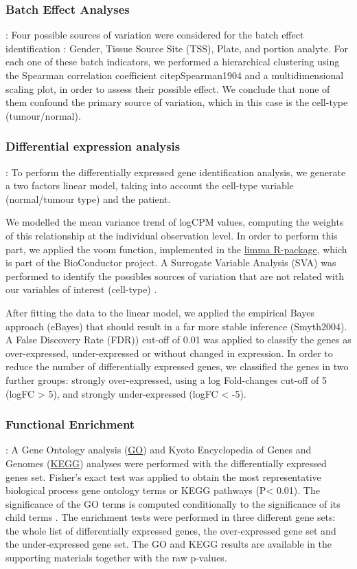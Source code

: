 \documentclass[9pt,twocolumn,twoside]{gsajnl}
\begin{document}
\subsubsection*{Batch Effect Analyses}
: Four possible sources of variation were considered for the batch effect identification \citep{Leek2010}: Gender, Tissue Source Site (TSS), Plate, and portion analyte. For each one of these batch indicators, we performed a hierarchical clustering using the Spearman correlation coefficient citep{Spearman1904}  and a multidimensional scaling plot, in order to assess their possible effect. We conclude that none of them confound the primary source of variation, which in this case is the cell-type (tumour/normal).

\subsubsection*{Differential expression analysis	}
: To perform the differentially expressed gene identification analysis, we generate a two factors linear model, taking into account the cell-type variable (normal/tumour type) and the patient.

We modelled the mean variance trend of logCPM values, computing the weights of this relationship at the individual observation level. In order to perform this part, we applied the voom function, implemented in the \href{https://bioconductor.org/packages/release/bioc/html/limma.html}{limma R-package}, which is part of the BioConductor project. A Surrogate Variable Analysis (SVA) was performed to identify the possibles sources of variation that are not related with our variables of interest (cell-type)  \citep{Leek2007}.

After fitting the data to the linear model, we applied the 	empirical Bayes approach (eBayes) that should result in a far more stable inference (Smyth2004). A False Discovery Rate (FDR)) \citep{Benjamini1995} cut-off of 0.01 was applied to classify the genes as over-expressed, under-expressed or without changed in expression. In order to reduce the number of differentially expressed genes, we classified the genes in two further groups: strongly over-expressed, using a log Fold-changes cut-off of 5 (logFC > 5), and strongly under-expressed (logFC < -5). 

\subsubsection*{Functional Enrichment}
: A Gene Ontology analysis (\href{http://geneontology.org}{GO}) and Kyoto Encyclopedia of Genes and Genomes (\href{http://www.genome.jp/kegg/}{KEGG}) analyses were performed with the differentially expressed genes set. Fisher's exact test \citep{Fisher1922} was applied to obtain the most representative biological process gene ontology terms or KEGG pathways (P< 0.01). The significance of the GO terms is computed conditionally to the significance of its child terms \citep{Alexa2006}. The enrichment tests were performed in three different gene sets: the whole list of differentially expressed genes, the over-expressed gene set and the under-expressed gene set. The GO and KEGG results are available in the supporting materials together with the raw p-values.
\end{document}
